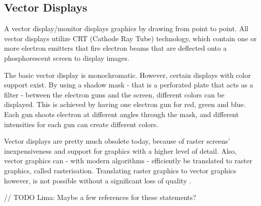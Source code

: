 \subsection{Vector Displays}
A vector display/monitor displays graphics by drawing from point to point. 
All vector displays utilize CRT (Cathode Ray Tube) technology, which contain one or more electron emitters that fire electron beams that are deflected onto a phosphorescent screen to display images.

The basic vector display is monochromatic. 
However, certain displays with color support exist. 
By using a shadow mask - that is a perforated plate that acts as a filter - between the electron guns and the screen, different colors can be displayed. This is achieved by having one electron gun for red, green and blue. Each gun shoots electron at different angles through the mask, and different intensities for each gun can create different colors.

Vector displays are pretty much obsolete today, because of raster screens' inexpensiveness and support for graphics with a higher level of detail. 
Also, vector graphics can - with modern algorithms - efficiently be translated to raster graphics, called rasterisation.
Translating raster graphics to vector graphics however, is not possible without a significant loss of quality \cite{inverse-rasterisation}.

// TODO Lima: Maybe a few references for these statements?